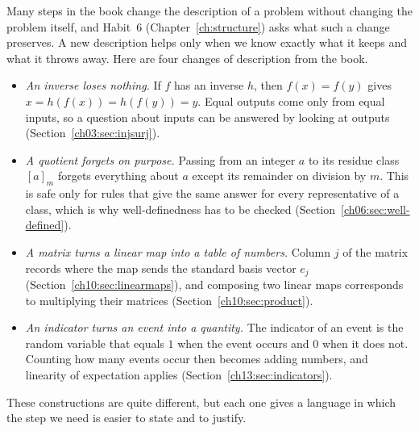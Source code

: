 Many steps in the book change the description of a problem without changing the problem itself, and Habit~6 (Chapter~\ref{ch:structure}) asks what such a change preserves. A new description helps only when we know exactly what it keeps and what it throws away. Here are four changes of description from the book.
\begin{itemize}
\item \emph{An inverse loses nothing.} If $f$ has an inverse $h$, then $f(x)=f(y)$ gives $x=h(f(x))=h(f(y))=y$. Equal outputs come only from equal inputs, so a question about inputs can be answered by looking at outputs (Section~\ref{ch03:sec:injsurj}).
\item \emph{A quotient forgets on purpose.} Passing from an integer $a$ to its residue class $[a]_m$ forgets everything about $a$ except its remainder on division by $m$. This is safe only for rules that give the same answer for every representative of a class, which is why well-definedness has to be checked (Section~\ref{ch06:sec:well-defined}).
\item \emph{A matrix turns a linear map into a table of numbers.} Column $j$ of the matrix records where the map sends the standard basis vector $e_j$ (Section~\ref{ch10:sec:linearmaps}), and composing two linear maps corresponds to multiplying their matrices (Section~\ref{ch10:sec:product}).
\item \emph{An indicator turns an event into a quantity.} The indicator of an event is the random variable that equals $1$ when the event occurs and $0$ when it does not. Counting how many events occur then becomes adding numbers, and linearity of expectation applies (Section~\ref{ch13:sec:indicators}).
\end{itemize}
These constructions are quite different, but each one gives a language in which the step we need is easier to state and to justify.
